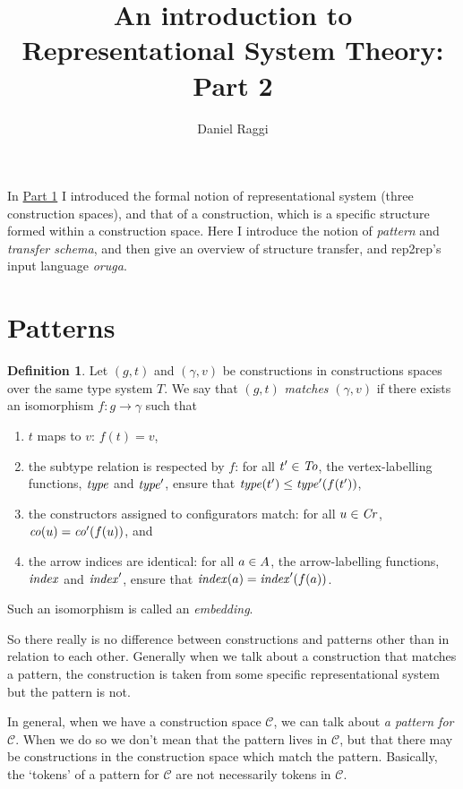 \documentclass[a4paper]{article}
\title{An introduction to Representational System Theory: Part 2}
\author{Daniel Raggi}
\theoremstyle{definition}
\newtheorem{definition}{Definition}
\begin{document}
	\maketitle
	In \href{https://github.com/danielraggi/rep2rep/blob/59c2d2b0f8759dd034a94a2186b4b5eadae40812/doc/RST-intro-part1.pdf}{Part 1} I introduced the formal notion of representational system (three construction spaces), and that of a construction, which is a specific structure formed within a construction space.
	Here I introduce the notion of \textit{pattern} and \textit{transfer schema}, and then give an overview of structure transfer, and rep2rep's input language \textit{oruga}.
	\section{Patterns}
	\begin{definition}
		Let $(g,t)$ and $(\gamma,v)$ be constructions in constructions spaces over the same type system $T$. We say that $(g,t)$ \textit{matches} $(\gamma,v)$ if there exists an isomorphism $f: g \to \gamma$ such that
		\begin{enumerate}[itemsep=1pt]
			\item $t$ maps to $v$: $f(t)=v$,
			\item the subtype relation is respected by $f$: for all $t'\in \mathit{To}$, the vertex-labelling functions, $\mathit{type}$ and $\mathit{type}'$, ensure that $\mathit{type}(t')\leq \mathit{type}'(f(t'))$,
			\item the constructors assigned to configurators match: for all $u\in \mathit{Cr}$, $\mathit{co}(u)=\mathit{co}'(f(u))$, and
			\item the arrow indices are identical: for all $a\in A$, the arrow-labelling functions, $\mathit{index}$ and $\mathit{index}'$, ensure that  $\mathit{index}(a)=\mathit{index}'(f(a))$.
		\end{enumerate}
		Such an isomorphism is called an \textit{embedding}.
	\end{definition}
	So there really is no difference between constructions and patterns other than in relation to each other. Generally when we talk about a construction that matches a pattern, the construction is taken from some specific representational system but the pattern is not.

	In general, when we have a construction space $\mathcal{C}$, we can talk about \textit{a pattern for $\mathcal{C}$}. When we do so we don't mean that the pattern lives in $\mathcal{C}$, but that there may be constructions in the construction space which match the pattern. Basically, the `tokens' of a pattern for $\mathcal{C}$ are not necessarily tokens in $\mathcal{C}$.
\end{document}

